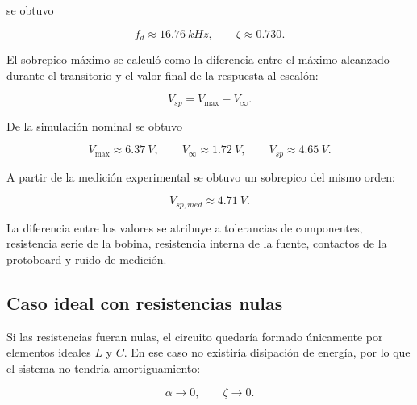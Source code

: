 se obtuvo

\begin{equation}
    \boxed{f_d \approx \SI{16.76}{kHz}},
    \qquad
    \boxed{\zeta \approx 0.730}.
\end{equation}

El sobrepico máximo se calculó como la diferencia entre el máximo alcanzado durante el transitorio y el valor final de la respuesta al escalón:

\begin{equation}
    V_{sp}=V_{\max}-V_{\infty}.
\end{equation}

De la simulación nominal se obtuvo

\begin{equation}
    V_{\max} \approx \SI{6.37}{V},
    \qquad
    V_{\infty} \approx \SI{1.72}{V},
    \qquad
    \boxed{V_{sp} \approx \SI{4.65}{V}}.
\end{equation}

A partir de la medición experimental se obtuvo un sobrepico del mismo orden:

\begin{equation}
    \boxed{V_{sp,med} \approx \SI{4.71}{V}}.
\end{equation}

La diferencia entre los valores se atribuye a tolerancias de componentes, resistencia serie de la bobina, resistencia interna de la fuente, contactos de la protoboard y ruido de medición.


\subsection{Caso ideal con resistencias nulas}

Si las resistencias fueran nulas, el circuito quedaría formado únicamente por elementos ideales $L$ y $C$. En ese caso no existiría disipación de energía, por lo que el sistema no tendría amortiguamiento:

\begin{equation}
    \alpha \rightarrow 0,
    \qquad
    \zeta \rightarrow 0.
\end{equation}

